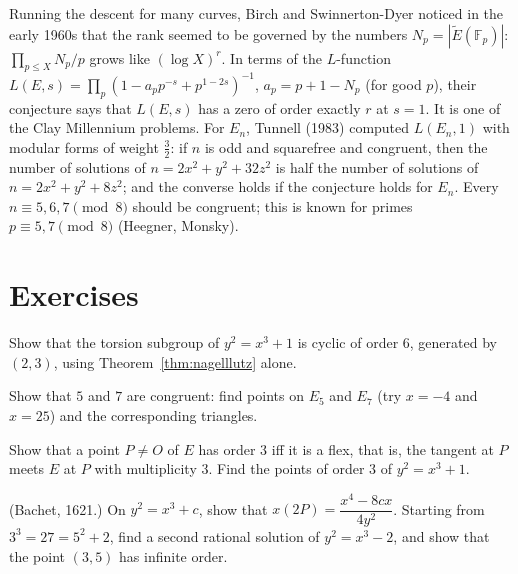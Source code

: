 \begin{remark}
Running the descent for many curves, Birch and Swinnerton-Dyer noticed in the early 1960s that the rank seemed to be governed by the numbers $N_p=|\tilde E(\mathbb F_p)|$:
$\prod_{p\le X}N_p/p$ grows like $(\log X)^r$. In terms of the $L$-function $L(E,s)=\prod_p(1-a_pp^{-s}+p^{1-2s})^{-1}$, $a_p=p+1-N_p$ (for good $p$), their conjecture
says that $L(E,s)$ has a zero of order exactly $r$ at $s=1$. It is one of the Clay Millennium problems. For $E_n$, Tunnell (1983) computed $L(E_n,1)$ with modular forms
of weight $\frac32$: if $n$ is odd and squarefree and congruent, then the number of solutions of $n=2x^2+y^2+32z^2$ is half the number of solutions of $n=2x^2+y^2+8z^2$; and
the converse holds if the conjecture holds for $E_n$. Every $n\equiv5,6,7\pmod8$ should be congruent; this is known for primes $p\equiv5,7\pmod8$ (Heegner, Monsky).
\end{remark}

\section{Exercises}

\begin{exercise}[$\star$]\label{ex:x3plus1}
Show that the torsion subgroup of $y^2=x^3+1$ is cyclic of order $6$, generated by $(2,3)$, using Theorem~\ref{thm:nagelllutz} alone.
\end{exercise}

\begin{exercise}[$\star$]\label{ex:five}
Show that $5$ and $7$ are congruent: find points on $E_5$ and $E_7$ (try $x=-4$ and $x=25$) and the corresponding triangles.
\end{exercise}

\begin{exercise}[$\star\star$]\label{ex:flex}
Show that a point $P\ne O$ of $E$ has order $3$ iff it is a flex, that is, the tangent at $P$ meets $E$ at $P$ with multiplicity $3$. Find the points of order $3$ of
$y^2=x^3+1$.
\end{exercise}

\begin{exercise}[$\star\star$]\label{ex:bachet}
(Bachet, 1621.) On $y^2=x^3+c$, show that $x(2P)=\dfrac{x^4-8cx}{4y^2}$. Starting from $3^3=27=5^2+2$, find a second rational solution of $y^2=x^3-2$, and
show that the point $(3,5)$ has infinite order.
\end{exercise}

